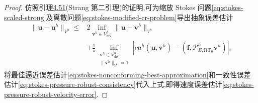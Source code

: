 \begin{proof}
仿照引理\hyperref[lem:stokes-strang-second]{4.51}(Strang 第二引理)的证明,可为缩放 Stokes 问题\cref{eq:stokes-scaled-strong}及离散问题\cref{eq:stokes-modified-cr-problem}导出抽象误差估计
\[
\begin{aligned}
  \|\bm{u}-\bm{u}^h\|_{V^h}
  \leq{}&
    2\inf_{\bm{v}^h\in V_{\mathrm{div}}^h}
       \|\bm{u}-\bm{v}^h\|_{V^h}\\
   &+\frac{1}{\nu}
       \inf_{\substack{\bm{v}^h\in V_{\mathrm{div}}^h\\
                       \|\bm{v}^h\|_{V^h}=1}}
       \left|\nu a^h(\bm{u},\bm{v}^h)
          -(\bm{f},\mathcal{P}_{E,\mathrm{RT}_0}^h\bm{v}^h)\right|.
\end{aligned}
\]
将最佳逼近误差估计\cref{eq:stokes-nonconforming-best-approximation}和一致性误差估计\cref{eq:stokes-pressure-robust-consistency}代入上式,即得速度误差估计\cref{eq:stokes-pressure-robust-velocity-error}.


\end{proof}
